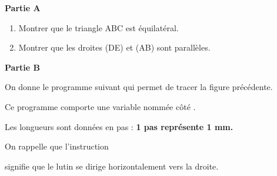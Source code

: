 \documentclass[11pt]{article}
\begin{document}
\textbf{Partie A}

\begin{enumerate}
	\item Montrer que le triangle ABC est équilatéral.
	\item Montrer que les droites (DE) et (AB) sont parallèles.
\end{enumerate}

\textbf{Partie B}

On donne le programme suivant qui permet de tracer la figure précédente.

Ce programme comporte une variable nommée \og{} côté \fg{}.

Les longueurs sont données en pas : \textbf{1 pas représente 1 mm.}

On rappelle que l'instruction \begin{scratch} \end{scratch} signifie que le lutin se dirige horizontalement vers la droite.
\end{document}

